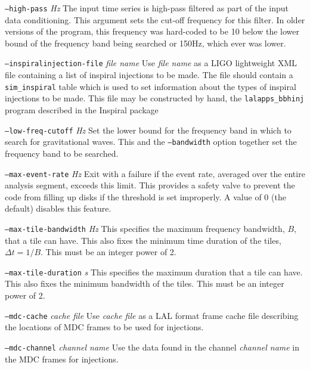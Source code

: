 \documentclass[10pt]{article}
\newcommand{\option}[1]{\texttt{#1}}
\newcommand{\parm}[1]{\textit{#1}}
\newenvironment{entry}%
{\begin{list}{}{\renewcommand{\makelabel}[1]%
{\parbox[b]{\labelwidth}{\makebox[0pt][l]{\textbf{##1}}\\}}%
\setlength{\labelwidth}{1em}%
\setlength{\labelsep}{1em}%
\setlength{\leftmargin}{2em}%
\setlength{\topsep}{\medskipamount}%
\setlength{\itemsep}{\medskipamount}%
\setlength{\parsep}{\medskipamount}%
\setlength{\listparindent}{0pt}}}
{\end{list}}
\begin{document}
\begin{entry}
\begin{entry}
\item[\option{--high-pass} \parm{Hz}]
The input time series is high-pass filtered as part of the input data
conditioning.  This argument sets the cut-off frequency for this filter.
In older versions of the program, this frequency was hard-coded to be
\unit{10}{\hertz} below the lower bound of the frequency band being
searched or \unit{150}{Hz}, which ever was lower.

\item[\option{--inspiralinjection-file} \parm{file name}]
Use \parm{file name} as a LIGO lightweight XML file containing a list of inspiral
injections to be made.   The file should contain a \verb+sim_inspiral+ table
which is used to set information about the types of inspiral injections to be made.
This file may be constructed by hand, the
\verb+lalapps_bbhinj+ program described in the Inspiral package   

\item[\option{--low-freq-cutoff} \parm{Hz}]
Set the lower bound for the frequency band in which to search for
gravitational waves.  This and the \option{--bandwidth} option together set
the frequency band to be searched.

\item[\option{--max-event-rate} \parm{Hz}]
Exit with a failure if the event rate, averaged over the entire analysis
segment, exceeds this limit.  This provides a safety valve to prevent the
code from filling up disks if the threshold is set improperly.  A value of
0 (the default) disables this feature.

\item[\option{--max-tile-bandwidth} \parm{Hz}]
This specifies the maximum frequency bandwidth, \(B\), that a tile can
have.  This also fixes the minimum time duration of the tiles, \(\Delta t =
1/B\).  This must be an integer power of 2.

\item[\option{--max-tile-duration} \parm{s}]
This specifies the maximum duration that a tile can have.  This also fixes
the minimum bandwidth of the tiles.  This must be an integer power of 2.

\item[\option{--mdc-cache} \parm{cache file}]
Use \parm{cache file} as a LAL format frame cache file describing the
locations of MDC frames to be used for injections.

\item[\option{--mdc-channel} \parm{channel name}]
Use the data found in the channel \parm{channel name} in the MDC frames for
injections.


\end{entry}
\end{entry}
\end{document}
